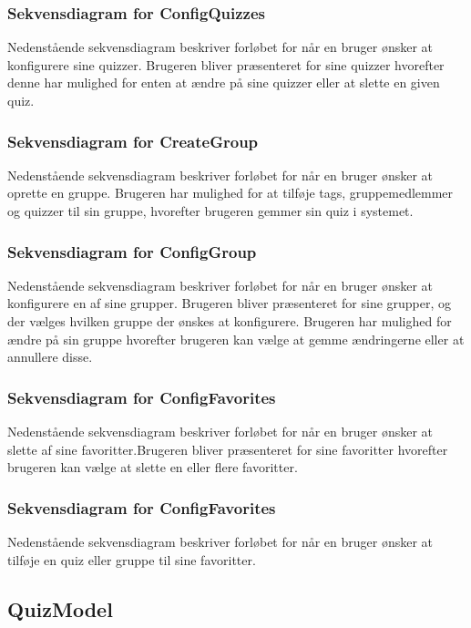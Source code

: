 
\subsubsection{Sekvensdiagram for ConfigQuizzes}
Nedenstående sekvensdiagram beskriver forløbet for når en bruger ønsker at konfigurere sine quizzer. Brugeren bliver præsenteret for sine quizzer hvorefter denne har mulighed for enten at ændre på sine quizzer eller at slette en given quiz.


\subsubsection{Sekvensdiagram for CreateGroup}
Nedenstående sekvensdiagram beskriver forløbet for når en bruger ønsker at oprette en gruppe. Brugeren har mulighed for at tilføje tags, gruppemedlemmer og quizzer til sin gruppe, hvorefter brugeren gemmer sin quiz i systemet.


\subsubsection{Sekvensdiagram for ConfigGroup}
Nedenstående sekvensdiagram beskriver forløbet for når en bruger ønsker at konfigurere en af sine grupper. Brugeren bliver præsenteret for sine grupper, og der vælges hvilken gruppe der ønskes at konfigurere. Brugeren har mulighed for ændre på sin gruppe hvorefter brugeren kan vælge at gemme ændringerne eller at annullere disse.


\subsubsection{Sekvensdiagram for ConfigFavorites}
Nedenstående sekvensdiagram beskriver forløbet for når en bruger ønsker at slette af sine favoritter.Brugeren bliver præsenteret for sine favoritter hvorefter brugeren kan vælge at slette en eller flere favoritter.


\subsubsection{Sekvensdiagram for ConfigFavorites}
Nedenstående sekvensdiagram beskriver forløbet for når en bruger ønsker at tilføje en quiz eller gruppe til sine favoritter.



\subsection{QuizModel}

